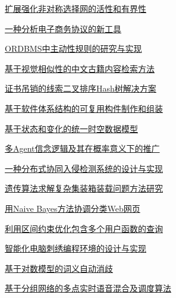 \documentclass[a4paper]{article}
\begin{document}
\href{http://www.jos.org.cn/ch/reader/download_pdf.aspx?file_no=20010907&year_id=2001&quarter_id=9&falg=1}{扩展强化非对称选择网的活性和有界性}

\href{http://www.jos.org.cn/ch/reader/download_pdf.aspx?file_no=20010908&year_id=2001&quarter_id=9&falg=1}{一种分析电子商务协议的新工具}

\href{http://www.jos.org.cn/ch/reader/download_pdf.aspx?file_no=20010909&year_id=2001&quarter_id=9&falg=1}{ORDBMS中主动性规则的研究与实现}

\href{http://www.jos.org.cn/ch/reader/download_pdf.aspx?file_no=20010910&year_id=2001&quarter_id=9&falg=1}{基于视觉相似性的中文古籍内容检索方法}

\href{http://www.jos.org.cn/ch/reader/download_pdf.aspx?file_no=20010911&year_id=2001&quarter_id=9&falg=1}{证书吊销的线索二叉排序Hash树解决方案}

\href{http://www.jos.org.cn/ch/reader/download_pdf.aspx?file_no=20010912&year_id=2001&quarter_id=9&falg=1}{基于软件体系结构的可复用构件制作和组装}

\href{http://www.jos.org.cn/ch/reader/download_pdf.aspx?file_no=20010913&year_id=2001&quarter_id=9&falg=1}{基于状态和变化的统一时空数据模型}

\href{http://www.jos.org.cn/ch/reader/download_pdf.aspx?file_no=20010914&year_id=2001&quarter_id=9&falg=1}{多Agent信念逻辑及其在概率意义下的推广}

\href{http://www.jos.org.cn/ch/reader/download_pdf.aspx?file_no=20010915&year_id=2001&quarter_id=9&falg=1}{一种分布式协同入侵检测系统的设计与实现}

\href{http://www.jos.org.cn/ch/reader/download_pdf.aspx?file_no=20010916&year_id=2001&quarter_id=9&falg=1}{遗传算法求解复杂集装箱装载问题方法研究}

\href{http://www.jos.org.cn/ch/reader/download_pdf.aspx?file_no=20010917&year_id=2001&quarter_id=9&falg=1}{用Naive Bayes方法协调分类Web网页}

\href{http://www.jos.org.cn/ch/reader/download_pdf.aspx?file_no=20010918&year_id=2001&quarter_id=9&falg=1}{利用区间约束优化包含多个用户函数的查询}

\href{http://www.jos.org.cn/ch/reader/download_pdf.aspx?file_no=20010919&year_id=2001&quarter_id=9&falg=1}{智能化电脑刺绣编程环境的设计与实现}

\href{http://www.jos.org.cn/ch/reader/download_pdf.aspx?file_no=20010920&year_id=2001&quarter_id=9&falg=1}{基于对数模型的词义自动消歧}

\href{http://www.jos.org.cn/ch/reader/download_pdf.aspx?file_no=20010921&year_id=2001&quarter_id=9&falg=1}{基于分组网络的多点实时语音混合及调度算法}
\end{document}
